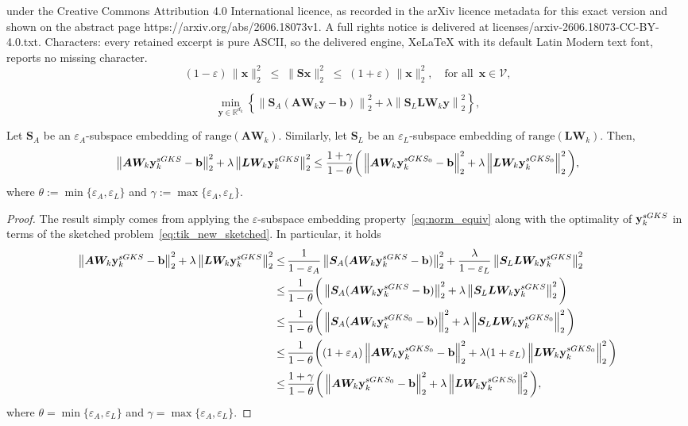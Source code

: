 \documentclass[10pt,a4paper]{amsart}
\newcommand{\R}{\ensuremath{\mathbb{R}}}
\newcommand{\bA}{\ensuremath{\boldsymbol{A}}}
\newcommand{\bL}{\ensuremath{\boldsymbol{L}}}
\newcommand{\bS}{\ensuremath{\boldsymbol{S}}}
\newcommand{\bW}{\ensuremath{\boldsymbol{W}}}
\newcommand{\bb}{\mathbf{b}}
\newcommand{\bx}{\mathbf{x}}
\newcommand{\by}{\mathbf{y}}
\newcommand{\norm}[1]{\left\|#1\right\|}
\begin{document}
under the Creative Commons Attribution 4.0 International licence, as recorded in the arXiv licence metadata for this exact version and shown on the abstract page https://arxiv.org/abs/2606.18073v1. A full rights notice is delivered at licenses/arxiv-2606.18073-CC-BY-4.0.txt. Characters: every retained excerpt is pure ASCII, so the delivered engine, XeLaTeX with its default Latin Modern text font, reports no missing character.
\begin{equation}\label{eq:norm_equiv}
  (1 - \varepsilon)\,\|\bx\|_2^2
  \;\le\; \|\bS\bx\|_2^2
  \;\le\; (1 + \varepsilon)\,\|\bx\|_2^2,
  \quad \text{for all }\, \bx \in \mathcal{V},
\end{equation}

\begin{equation}\label{eq:tik_new_sketched}
 \min_{\by \in \R^{d_k}} \left\{ \norm{\bS_A(\bA\bW_k\by - \bb)}_2^2 + \lambda\norm{\bS_L\bL\bW_k\by}_2^2 \right\},
\end{equation}

\begin{proposition}\label{Prop_res_sketching}
Let $\bS_A$ be an $\varepsilon_A$-subspace embedding of $\text{range}(\bA\bW_k)$. Similarly, let $\bS_L$ be an $\varepsilon_L$-subspace embedding of $\text{range}(\bL\bW_k)$. Then,
$$\norm{\bA\bW_k\by_k^{\rm sGKS} - \bb}_2^2 + \lambda\norm{\bL\bW_k\by_k^{\rm sGKS}}_2^2\leq \frac{1+\gamma}{1-\theta}\bigg(\norm{\bA\bW_k\by_k^{\rm sGKS_0} - \bb}_2^2 +\lambda\norm{\bL\bW_k\by_k^{\rm sGKS_0}}_2^2\bigg),$$
where  $\theta:=\min\{\varepsilon_A,\varepsilon_L\}$ and $\gamma:=\max\{\varepsilon_A,\varepsilon_L\}$.
\end{proposition}

\begin{proof}
The result simply comes from applying the $\varepsilon$-subspace embedding property~\eqref{eq:norm_equiv} along with the optimality of $\by_k^{\rm sGKS}$ in terms of the sketched problem~\eqref{eq:tik_new_sketched}. In particular, it holds 
{\small
\begin{align*}
\norm{\bA\bW_k\by_k^{\rm sGKS} - \bb}_2^2+\lambda\norm{\bL\bW_k\by_k^{\rm sGKS}}_2^2\leq & \, \frac{1}{1-\varepsilon_A}\norm{\bS_A(\bA\bW_k\by_k^{\rm sGKS} - \bb)}_2^2+\frac{\lambda}{1-\varepsilon_L}\norm{\bS_L\bL\bW_k\by_k^{\rm sGKS}}_2^2\\
\leq& \,
\frac{1}{1-\theta}\bigg(\norm{\bS_A(\bA\bW_k\by_k^{\rm sGKS} - \bb)}_2^2+\lambda\norm{\bS_L\bL\bW_k\by_k^{\rm sGKS}}_2^2
\bigg)\\
\leq& \,
\frac{1}{1-\theta}\bigg(\norm{\bS_A(\bA\bW_k\by_k^{\rm sGKS_0} - \bb)}_2^2+\lambda\norm{\bS_L\bL\bW_k\by_k^{\rm sGKS_0}}_2^2
\bigg)\\
\leq &\,
\frac{1}{1-\theta}\bigg((1+\varepsilon_A)\norm{\bA\bW_k\by_k^{\rm sGKS_0} - \bb}_2^2+\lambda(1+\varepsilon_L)\norm{\bL\bW_k\by_k^{\rm sGKS_0}}_2^2
\bigg)\\
\leq&\, \frac{1+\gamma}{1-\theta}\bigg(\norm{\bA\bW_k\by_k^{\rm sGKS_0} - \bb}_2^2+\lambda\norm{\bL\bW_k\by_k^{\rm sGKS_0}}_2^2
\bigg),
\end{align*}
}
where $\theta=\min\{\varepsilon_A,\varepsilon_L\}$ and $\gamma=\max\{\varepsilon_A,\varepsilon_L\}$.
\end{proof}
\end{document}

